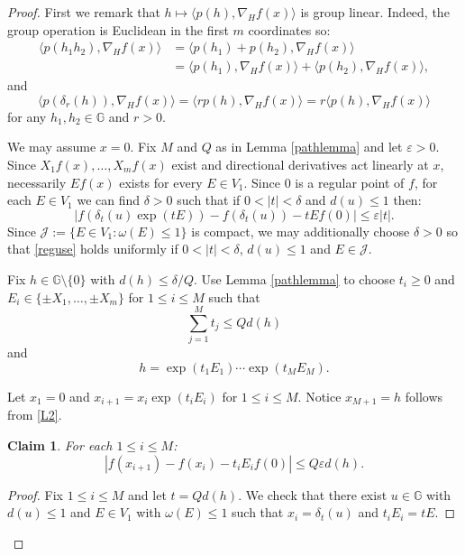 \documentclass[reqno, 11pt]{amsart}
\newtheorem{claim}[theorem]{Claim}
\theoremstyle{definition}
\theoremstyle{remark}
\numberwithin{theorem}{section}
\numberwithin{equation}{section}
\begin{document}
\begin{proof}
First we remark that $h\mapsto \langle p(h), \nabla_{H}f(x) \rangle$ is group linear. Indeed, the group operation is Euclidean in the first $m$ coordinates so:
\begin{align*}
\langle p(h_{1}h_{2}), \nabla_{H}f(x) \rangle &= \langle p(h_{1})+p(h_{2}), \nabla_{H}f(x) \rangle\\
&= \langle p(h_{1}), \nabla_{H}f(x) \rangle + \langle p(h_{2}), \nabla_{H}f(x) \rangle,
\end{align*}
and
\[\langle p(\delta_{r}(h)), \nabla_{H}f(x) \rangle= \langle rp(h), \nabla_{H}f(x) \rangle = r\langle p(h), \nabla_{H}f(x) \rangle\]
for any $h_{1}, h_{2}\in \mathbb{G}$ and $r>0$.

We may assume $x=0$. Fix $M$ and $Q$ as in Lemma \ref{pathlemma} and let $\varepsilon>0$. Since $X_{1}f(x), \ldots, X_{m}f(x)$ exist and directional derivatives act linearly at $x$, necessarily $Ef(x)$ exists for every $E\in V_{1}$. Since $0$ is a regular point of $f$, for each $E\in V_{1}$ we can find $\delta>0$ such that if $0<|t|<\delta$ and $d(u)\leq 1$ then:
\begin{equation}\label{reguse}|f(\delta_{t}(u)\exp(tE))-f(\delta_{t}(u))-tEf(0)|\leq \varepsilon |t|. \end{equation}
Since $\mathcal{J}:=\{E\in V_{1}: \omega(E)\leq 1\}$ is compact, we may additionally choose $\delta>0$ so that \eqref{reguse} holds uniformly if $0<|t|<\delta$, $d(u)\leq 1$ and $E\in\mathcal{J}$.

Fix $h\in \mathbb{G}\setminus\{0\}$ with $d(h)\leq \delta/Q$. Use Lemma \ref{pathlemma} to choose $t_{i}\geq 0$ and $E_{i}\in \{\pm X_{1}, \ldots, \pm X_{m}\}$ for $1\leq i\leq M$ such that 
\begin{equation}\label{L1}
\sum_{j=1}^{M} t_{j} \leq Qd(h)
\end{equation}
and
\begin{equation}\label{L2}
h=\exp(t_{1}E_{1}) \cdots \exp(t_{M}E_{M}).
\end{equation}

Let $x_{1}=0$ and $x_{i+1}=x_{i}\exp(t_{i}E_{i})$ for $1\leq i\leq M$. Notice $x_{M+1}=h$ follows from \eqref{L2}.
\begin{claim}
For each $1\leq i\leq M$:
\[|f(x_{i+1})-f(x_{i})-t_{i}E_{i}f(0)|\leq Q\varepsilon d(h).\]
\end{claim}

\begin{proof}
Fix $1\leq i\leq M$ and let $t=Qd(h)$. We check that there exist $u\in\mathbb{G}$ with $d(u)\leq 1$ and $E\in V_{1}$ with $\omega(E)\leq 1$ such that $x_{i}=\delta_{t}(u)$ and $t_{i}E_{i}=tE$.


\end{proof}
\end{proof}
\end{document}
